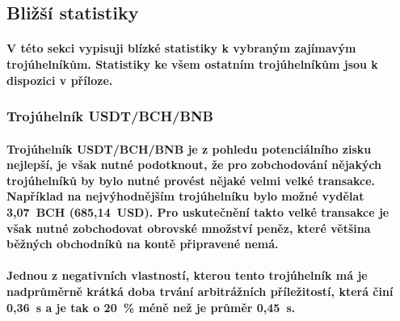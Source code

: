 \documentclass[thesis=B,czech]{FITthesis}[2019/03/21]
\begin{document}
\subsection{Bližší statistiky}
\paragraph{
V této sekci vypisuji blízké statistiky k vybraným zajímavým trojúhelníkům. Statistiky ke všem ostatním trojúhelníkům jsou k dispozici v příloze.
}
\subsubsection{Trojúhelník USDT/BCH/BNB}
\paragraph{
Trojúhelník USDT/BCH/BNB je z pohledu potenciálního zisku nejlepší, je však nutné podotknout, že pro zobchodování nějakých trojúhelníků by bylo nutné provést nějaké velmi velké transakce. Například na nejvýhodnějším trojúhelníku bylo možné vydělat 3,07~BCH (685,14~USD). Pro uskutečnění takto velké transakce je však nutné zobchodovat obrovské množství peněz, které většina běžných obchodníků na kontě připravené nemá.
}
\paragraph{
Jednou z negativních vlastností, kterou tento trojúhelník má je nadprůměrně krátká doba trvání arbitrážních příležitostí, která činí 0,36~s a je tak o 20~\% méně než je průměr 0,45~s.
}
\end{document}
